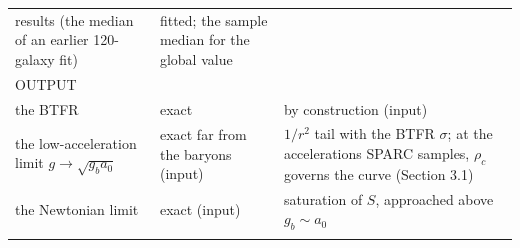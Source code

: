 \documentclass[
  10pt,
]{article}
\begin{document}
\begin{longtable}[]{@{}lll@{}}
\begin{minipage}[t]{0.20\columnwidth}
results (the median of an earlier 120-galaxy fit)\strut
\end{minipage} & \begin{minipage}[t]{0.50\columnwidth}\raggedright
fitted; the sample median for the global value\strut
\end{minipage}\tabularnewline
\begin{minipage}[t]{0.24\columnwidth}\raggedright
OUTPUT\strut
\end{minipage} & \begin{minipage}[t]{0.20\columnwidth}\raggedright
\strut
\end{minipage} & \begin{minipage}[t]{0.50\columnwidth}\raggedright
\strut
\end{minipage}\tabularnewline
\begin{minipage}[t]{0.24\columnwidth}\raggedright
the BTFR\strut
\end{minipage} & \begin{minipage}[t]{0.20\columnwidth}\raggedright
exact\strut
\end{minipage} & \begin{minipage}[t]{0.50\columnwidth}\raggedright
by construction (input)\strut
\end{minipage}\tabularnewline
\begin{minipage}[t]{0.24\columnwidth}\raggedright
the low-acceleration limit $g\to\sqrt{g_b a_0}$\strut
\end{minipage} & \begin{minipage}[t]{0.20\columnwidth}\raggedright
exact far from the baryons (input)\strut
\end{minipage} & \begin{minipage}[t]{0.50\columnwidth}\raggedright
$1/r^2$ tail with the BTFR $\sigma$; at the accelerations SPARC samples, $\rho_c$ governs the curve (Section 3.1)\strut
\end{minipage}\tabularnewline
\begin{minipage}[t]{0.24\columnwidth}\raggedright
the Newtonian limit\strut
\end{minipage} & \begin{minipage}[t]{0.20\columnwidth}\raggedright
exact (input)\strut
\end{minipage} & \begin{minipage}[t]{0.50\columnwidth}\raggedright
saturation of $S$, approached above $g_b\sim a_0$\strut
\end{minipage}\tabularnewline
\begin{minipage}[t]{0.24\columnwidth}\raggedright

\end{minipage}
\end{longtable}
\end{document}
